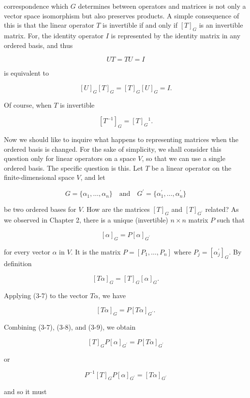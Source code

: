correspondence which \({{G}}\) determines between operators and matrices is not only a vector space isomorphism but also preserves products. A simple consequence of this is that the linear operator \(T\) is invertible if and only if \([T]_{{{G}}}\) is an invertible matrix. For, the identity operator \(I\) is represented by the identity matrix in any ordered basis, and thus

\[UT=TU=I\]

is equivalent to

\[[U]_{{{G}}}[T]_{{{G}}}=[T]_{{{G}}}[U]_{{{G}}}=I.\]

Of course, when \(T\) is invertible

\[[T^{-1}]_{{{G}}}=[T]_{{{G}}}{}^{1}.\]

Now we should like to inquire what happens to representing matrices when the ordered basis is changed. For the sake of simplicity, we shall consider this question only for linear operators on a space \(V\), so that we can use a single ordered basis. The specific question is this. Let \(T\) be a linear operator on the finite-dimensional space \(V\), and let

\[{{G}}=\{\alpha_{1},\ldots,\alpha_{n}\}\quad\mbox{and}\quad{{G}}^{\prime}=\{ \alpha^{\prime}_{1},\ldots,\alpha^{\prime}_{n}\}\]

be two ordered bases for \(V\). How are the matrices \([T]_{{{G}}}\) and \([T]_{{{G}}^{\prime}}\) related? As we observed in Chapter 2, there is a unique (invertible) \(n\times n\) matrix \(P\) such that

\[[\alpha]_{{{G}}}=P[\alpha]_{{{G}}^{\prime}}\]

for every vector \(\alpha\) in \(V\). It is the matrix \(P=[P_{1},\ldots,P_{n}]\) where \(P_{j}=[\alpha^{\prime}_{j}]_{{{G}}}\). By definition

\[[T\alpha]_{{{G}}}=[T]_{{{G}}}[\alpha]_{{{G}}}.\]

Applying (3-7) to the vector \(T\alpha\), we have

\[[T\alpha]_{{{G}}}=P[T\alpha]_{{{G}}^{\prime}}.\]

Combining (3-7), (3-8), and (3-9), we obtain

\[[T]_{{{G}}}P[\alpha]_{{{G}}^{\prime}}=P[T\alpha]_{{{G}}^{\prime}}\]

or

\[P^{-1}[T]_{{{G}}}P[\alpha]_{{{G}}^{\prime}}=[T\alpha]_{{{G}}^{\prime}}\]

and so it must 
